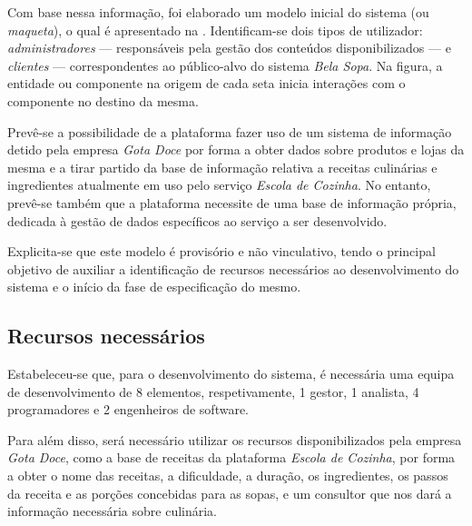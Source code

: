 Com base nessa informação, foi elaborado um modelo inicial do sistema (ou \emph{maqueta}), o qual é apresentado na . Identificam-se dois tipos de utilizador: \emph{administradores} --- responsáveis pela gestão dos conteúdos disponibilizados --- e \emph{clientes} --- correspondentes ao público-alvo do sistema \emph{Bela Sopa}. Na figura, a entidade ou componente na origem de cada seta inicia interações com o componente no destino da mesma.

Prevê-se a possibilidade de a plataforma fazer uso de um sistema de informação detido pela empresa \emph{Gota Doce} por forma a obter dados sobre produtos e lojas da mesma e a tirar partido da base de informação relativa a receitas culinárias e ingredientes atualmente em uso pelo serviço \emph{Escola de Cozinha}. No entanto, prevê-se também que a plataforma necessite de uma base de informação própria, dedicada à gestão de dados específicos ao serviço a ser desenvolvido.

Explicita-se que este modelo é provisório e não vinculativo, tendo o principal objetivo de auxiliar a identificação de recursos necessários ao desenvolvimento do sistema e o início da fase de especificação do mesmo.


\subsection{Recursos necessários}
\label{sec:planeamento:recursos}


Estabeleceu-se que, para o desenvolvimento do sistema, é necessária uma equipa de desenvolvimento de 8 elementos, respetivamente, 1 gestor, 1 analista, 4 programadores e 2 engenheiros de software.

Para além disso, será necessário utilizar os recursos disponibilizados pela empresa \emph{Gota Doce}, como a base de receitas da plataforma \emph{Escola de Cozinha}, por forma a obter o nome das receitas, a dificuldade, a duração, os ingredientes, os passos da receita e as porções concebidas para as sopas, e um consultor que nos dará a informação necessária sobre culinária.

